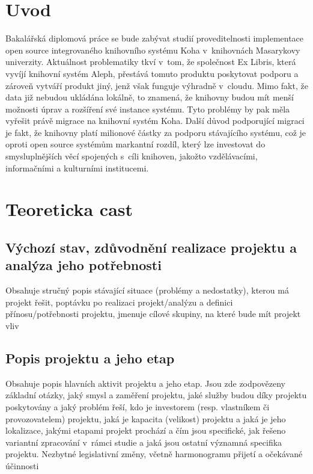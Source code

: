 \documentclass[
	12pt, oneside, printed, final, 
	table,   %
	lof,     %
	lot     %
]{fithesis3}
\begin{document}
{\fontsize{12}{18}

\chapter{Uvod}

Bakalářská diplomová práce se bude zabývat studií proveditelnosti implementace 
open source integrovaného knihovního systému Koha v~knihovnách Masarykovy univerzity. 
Aktuálnost problematiky tkví v~tom, že společnost Ex Libris, která vyvíjí knihovní 
systém Aleph, přestává tomuto produktu poskytovat podporu a zároveň vytváří produkt jiný, 
jenž však funguje výhradně v~cloudu. 
Mimo fakt, že data již nebudou ukládána lokálně, to znamená, že knihovny budou mít 
menší možnosti úprav a rozšíření své instance systému. Tyto problémy by pak měla 
vyřešit právě migrace na knihovní systém Koha. 
Další důvod podporující migraci je fakt, že knihovny platí milionové částky za 
podporu stávajícího systému, což je oproti open source systémům markantní rozdíl, 
který lze investovat do smysluplnějších  věcí spojených s~cíli knihoven, 
jakožto vzdělávacími, informačními a kulturními institucemi. 

\chapter{Teoreticka cast }

\section{Výchozí stav, zdůvodnění realizace projektu a analýza jeho potřebnosti}

Obsahuje stručný popis stávající situace (problémy a nedostatky), kterou má projekt
řešit, poptávku po realizaci projekt/analýzu a definici přínosu/potřebnosti projektu,
jmenuje cílové skupiny, na které bude mít projekt vliv

\section{Popis projektu a jeho etap}

Obsahuje popis hlavních aktivit projektu a jeho etap. Jsou zde zodpovězeny základní
otázky, jaký smysl a zaměření projektu, jaké služby budou díky projektu poskytovány
a jaký problém řeší, kdo je investorem (resp. vlastníkem či provozovatelem) projektu,
jaká je kapacita (velikost) projektu a jaká je jeho lokalizace, jakými etapami projekt
prochází a čím jsou specifické, jak řešeno variantní zpracování v~rámci studie a jaká
jsou ostatní významná specifika projektu. Nezbytné legislativní změny, včetně
harmonogramu přijetí a očekávané účinnosti

}
\end{document}
